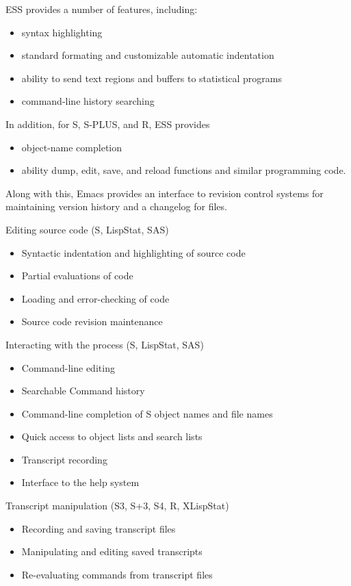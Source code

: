 \documentclass{article}
\begin{document}
ESS provides a number of features, including:
\begin{itemize}
\item syntax highlighting 
\item standard formating and customizable automatic indentation
\item ability to send text regions and buffers to statistical programs
\item command-line history searching 
\end{itemize}

In addition, for S, S-PLUS, and R, ESS provides
\begin{itemize}
\item object-name completion
\item ability dump, edit, save, and reload functions and similar
  programming code.
\end{itemize}

Along with this, Emacs provides an interface to revision control
systems for maintaining version history and a changelog for files.

Editing source code (S, LispStat, SAS)
\begin{itemize}
\item Syntactic indentation and highlighting of source code
\item Partial evaluations of code
\item Loading and error-checking of code
\item Source code revision maintenance
\end{itemize}

Interacting with the process (S, LispStat, SAS)
\begin{itemize}
\item Command-line editing
\item Searchable Command history
\item Command-line completion of S object names and file names
\item Quick access to object lists and search lists
\item Transcript recording
\item Interface to the help system
\end{itemize}

Transcript manipulation (S3, S+3, S4, R, XLispStat)
\begin{itemize}
\item Recording and saving transcript files
\item Manipulating and editing saved transcripts
\item Re-evaluating commands from transcript files
\end{itemize}
\end{document}
